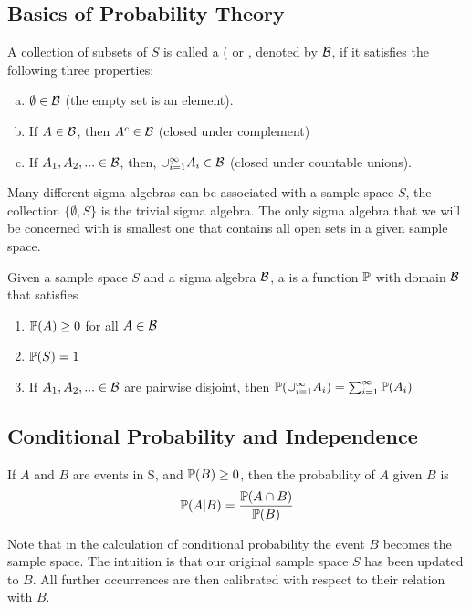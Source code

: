 \subsection{Basics of Probability Theory}
\begin{definition}
    A collection of subsets of $S$ is called a  ( or , denoted by $\mathcal B$, if it satisfies the following three properties:
    
    \begin{enumerate}[(a)]
        \item $\emptyset \in \mathcal B$ (the empty set is an element).
        \item If $A \in \mathcal B$, then $A^c \in \mathcal B$ (closed under complement) 
        \item If $A_1, A_2, ... \in \mathcal B$, then, $\cup_{i=1}^{\infty}A_i \in \mathcal B$ (closed under countable unions).
    \end{enumerate}
\end{definition}
Many different sigma algebras can be associated with a sample space $S$, the collection $\{\emptyset, S\}$ is the trivial sigma algebra. The only sigma algebra that we will be concerned with is smallest one that contains all open sets in a given sample space.

\begin{definition}
    Given a sample space $S$ and a sigma algebra $\mathcal B$, a  is a function $\mathbb P$ with domain $\mathcal B$ that satisfies
    \begin{enumerate}
        \item $\mathbb P(A) \geq 0$ for all $A \in \mathcal B$
        \item $\mathbb P(S) = 1$
        \item If $A_1, A_2,... \in \mathcal B$ are pairwise disjoint, then $\mathbb P(\cup_{i=1}^{\infty}A_i) = \sum_{i=1}^{\infty}\mathbb P(A_i)$
    \end{enumerate}
\end{definition}


\subsection{Conditional Probability and Independence}
\begin{definition}
    If $A$ and $B$ are events in S, and $\mathbb P(B) \geq 0$, then the  probability of $A$ given $B$ is
    $$
    \mathbb P(A|B) = \frac{\mathbb P(A \cap B)}{\mathbb P(B)}
    $$
\end{definition}
Note that in the calculation of conditional probability the event $B$ becomes the sample space. The intuition is that our original sample space $S$ has been updated to $B$. All further occurrences are then calibrated with respect to their relation with $B$.

